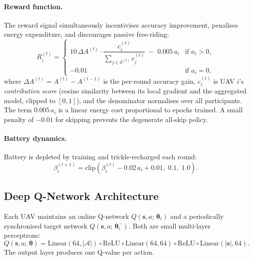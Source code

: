 \documentclass[12pt,a4paper]{article}
\begin{document}
\paragraph{Reward function.}
The reward signal simultaneously incentivises accuracy improvement, penalises
energy expenditure, and discourages passive free-riding:
\begin{equation}
  R_i^{(t)} = \begin{cases}
    10\,\Delta A^{(t)} \cdot \dfrac{c_i^{(t)}}{\displaystyle\sum_{j \in \mathcal{S}^{(t)}} c_j^{(t)}}
    \;-\; 0.005\,a_i & \text{if } a_i > 0, \\[6pt]
    -0.01 & \text{if } a_i = 0,
  \end{cases}
  \label{eq:reward}
\end{equation}
where $\Delta A^{(t)} = A^{(t)} - A^{(t-1)}$ is the per-round accuracy gain,
$c_i^{(t)}$ is UAV $i$'s \emph{contribution score} (cosine similarity between its
local gradient and the aggregated model, clipped to $[0,1]$), and the
denominator normalises over all participants.  The term $0.005\,a_i$ is a linear
energy cost proportional to epochs trained.  A small penalty of $-0.01$ for
skipping prevents the degenerate all-skip policy.

\paragraph{Battery dynamics.}
Battery is depleted by training and trickle-recharged each round:
\begin{equation}
  \beta_i^{(t+1)} = \mathrm{clip}\!\left(\beta_i^{(t)} - 0.02\,a_i + 0.01,\; 0.1,\; 1.0\right).
  \label{eq:battery}
\end{equation}

\subsection{Deep Q-Network Architecture}

Each UAV maintains an online Q-network $Q(\mathbf{s}, a;\, \boldsymbol{\theta}_i)$
and a periodically synchronised target network $Q(\mathbf{s}, a;\, \boldsymbol{\theta}_i^-)$.
Both are small multi-layer perceptrons:
\begin{equation}
  Q(\mathbf{s}, a;\, \boldsymbol{\theta}) =
    \mathrm{Linear}(64, |\mathcal{A}|) \circ \mathrm{ReLU} \circ
    \mathrm{Linear}(64, 64) \circ \mathrm{ReLU} \circ
    \mathrm{Linear}(|\mathbf{s}|, 64).
  \label{eq:qnet}
\end{equation}
The output layer produces one Q-value per action.
\end{document}
